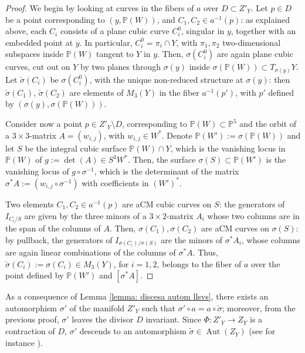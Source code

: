 \documentclass{amsart}
\theoremstyle{definition}
\newcommand{\ra}{\rightarrow}
\newcommand{\coloneqq}{:=}
\DeclareMathOperator{\aut}{Aut}
\begin{document}
\begin{proof}
We begin by looking at curves in the fibers of $a$ over $D \subset Z'_Y$. Let $p \in D$ be a point corresponding to $(y, \mathbb{P}(W))$, and $C_1, C_2 \in a^{-1}(p)$: as explained above, each $C_i$ consists of a plane cubic curve $C^0_i$, singular in $y$, together with an embedded point at $y$. In particular, $C^0_i = \pi_i \cap Y$, with $\pi_1,\pi_2 $ two-dimensional subspaces inside $\mathbb{P}(W)$ tangent to $Y$ in $y$. Then, $\sigma(C^0_i)$ are again plane cubic curves, cut out on $Y$ by two planes through $\sigma(y)$ inside $\sigma\left( \mathbb{P}(W) \right) \subset T_{\sigma(y)}Y$. Let $\check{\sigma}(C_i)$ be $\sigma(C^0_i)$, with the unique non-reduced structure at $\sigma(y)$: then $\check{\sigma}(C_1)$, $\check{\sigma}(C_2)$ are elements of $M_3(Y)$ in the fiber $a^{-1}(p')$, with $p'$ defined by $(\sigma(y), \sigma\left( \mathbb{P}(W) \right))$.

Consider now a point $p \in Z'_Y \setminus D$, corresponding to $\mathbb{P}(W) \subset \mathbb{P}^5$ and the orbit of a $3 \times 3$-matrix $A= \left( w_{i,j} \right)$, with $w_{i,j} \in W^*$. Denote $\mathbb{P}(W') \coloneqq \sigma\left( \mathbb{P}(W) \right)$ and let $S$ be the integral cubic surface $\mathbb{P}(W) \cap Y$, which is the vanishing locus in $\mathbb{P}(W)$ of $g \coloneqq \det(A) \in S^3 W^*$. Then, the surface $\sigma(S) \subset \mathbb{P}(W')$ is the vanishing locus of $g \circ \sigma^{-1}$, which is the determinant of the matrix $\sigma^* A \coloneqq \left( w_{i,j} \circ \sigma^{-1} \right)$ with coefficients in $\left( W' \right)^*$.

Two elements $C_1, C_2 \in a^{-1}(p)$ are aCM cubic curves on $S$: the generators of $I_{C_i/S}$ are given by the three minors of a $3 \times 2$-matrix $A_i$ whose two columns are in the span of the columns of $A$. Then, $\sigma(C_1), \sigma(C_2)$ are aCM curves on $\sigma(S)$: by pullback, the generators of $I_{\sigma(C_i)/\sigma(S)}$ are the minors of $\sigma^* A_i$, whose columns are again linear combinations of the columns of $\sigma^* A$. Thus, $\check{\sigma}(C_i) \coloneqq \sigma(C_i) \in M_3(Y)$, for $i=1,2$, belongs to the fiber of $a$ over the point defined by $\mathbb{P}(W')$ and $[\sigma^* A]$.  
\end{proof}

As a consequence of Lemma \ref{lemma: discesa autom llsvs}, there exists an automorphism $\sigma'$ of the manifold $Z'_Y$ such that $\sigma' \circ a = a \circ \check{\sigma}$; moreover, from the previous proof, $\sigma'$ leaves the divisor $D$ invariant. Since $\Phi: Z'_Y \ra Z_Y$ is a contraction of $D$, $\sigma'$ descends to an automorphism $\tilde{\sigma} \in \aut(Z_Y)$ (see for instance \cite[Lemma 3.2]{descent}).
\end{document}
